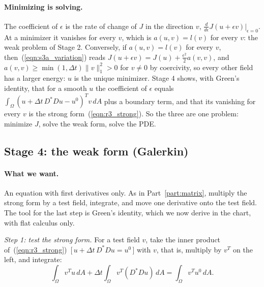 \paragraph{Minimizing is solving.} The coefficient of $\epsilon$ is the rate of change of $J$ in the direction $v$, $\frac{d}{d\epsilon}J(u + \epsilon v)\big|_{\epsilon = 0}$. At a minimizer it vanishes for every $v$, which is $a(u, v) = l(v)$ for every $v$: the weak problem of Stage 2. Conversely, if $a(u, v) = l(v)$ for every $v$, then~(\ref{eqn:s3a_variation}) reads $J(u + \epsilon v) = J(u) + \frac{\epsilon^2}{2}a(v, v)$, and $a(v, v) \ge \min(1, \Delta t)\|v\|_1^2 > 0$ for $v \ne 0$ by coercivity, so every other field has a larger energy: $u$ is the unique minimizer. Stage 4 shows, with Green's identity, that for a smooth $u$ the coefficient of $\epsilon$ equals $\int_\Omega (u + \Delta t\, D^*Du - u^0)^Tv\, dA$ plus a boundary term, and that its vanishing for every $v$ is the strong form~(\ref{eqn:r3_strong}). So the three are one problem: minimize $J$, solve the weak form, solve the PDE.

\subsection{Stage 4: the weak form (Galerkin)}
\label{section:r3_stage4}

\paragraph{What we want.} An equation with first derivatives only. As in Part~\ref{part:matrix}, multiply the strong form by a test field, integrate, and move one derivative onto the test field. The tool for the last step is Green's identity, which we now derive in the chart, with flat calculus only.

\emph{Step 1: test the strong form.} For a test field $v$, take the inner product of~(\ref{eqn:r3_strong})~[\,$u + \Delta t\, D^*Du = u^0$\,] with $v$, that is, multiply by $v^T$ on the left, and integrate:
\begin{equation}
\label{eqn:s3a_tested}
\int_\Omega v^Tu\, dA + \Delta t\int_\Omega v^T(D^*Du)\, dA = \int_\Omega v^Tu^0\, dA .
\end{equation}

